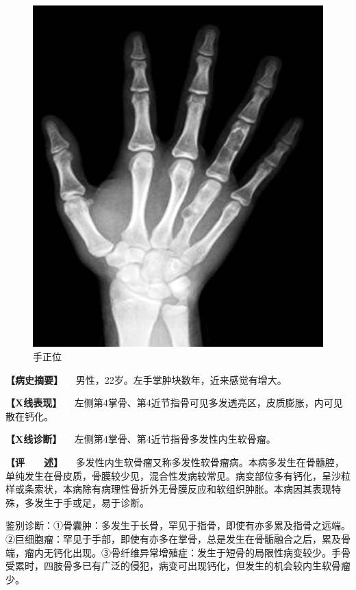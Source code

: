 \begin{figure}[!htbp]
 \centering
 \includegraphics{./images/Image00090.jpg}
 \captionsetup{justification=centering}
 \caption{手正位}
 \label{fig2-7-5}
  \end{figure} 

\textbf{【病史摘要】} 　男性，22岁。左手掌肿块数年，近来感觉有增大。

\textbf{【X线表现】}
　左侧第4掌骨、第4近节指骨可见多发透亮区，皮质膨胀，内可见散在钙化。

\textbf{【X线诊断】} 　左侧第4掌骨、第4近节指骨多发性内生软骨瘤。

\textbf{【评　　述】}
　多发性内生软骨瘤又称多发性软骨瘤病。本病多发生在骨髓腔，单纯发生在骨皮质，骨膜较少见，混合性发病较常见。病变部位多有钙化，呈沙粒样或条索状，本病除有病理性骨折外无骨膜反应和软组织肿胀。本病因其表现特殊，多发生于手或足，易于诊断。

鉴别诊断：①骨囊肿：多发生于长骨，罕见于指骨，即使有亦多累及指骨之远端。②巨细胞瘤：罕见于手部，即使有亦多在掌骨，总是发生在骨骺融合之后，累及骨端，瘤内无钙化出现。③骨纤维异常增殖症：发生于短骨的局限性病变较少。手骨受累时，四肢骨多已有广泛的侵犯，病变可出现钙化，但发生的机会较内生软骨瘤少。

